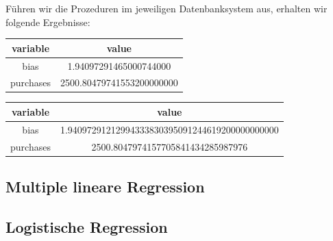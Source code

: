 Führen wir die Prozeduren im jeweiligen Datenbanksystem aus, erhalten wir folgende Ergebnisse:

\begin{center}
  \begin{tabular}{|c|c|}\hline
    \textbf{variable} & \textbf{value} \\ \hline
    bias & 1.94097291465000744000 \\ \hline
    purchases & 2500.80479741553200000000 \\ \hline
  \end{tabular}

  \begin{tabular}{|c|c|}\hline
    \textbf{variable} & \textbf{value} \\ \hline
    bias & 1.94097291212994333830395091244619200000000000 \\ \hline
    purchases & 2500.8047974157705841434285987976 \\ \hline
  \end{tabular}
\end{center}

\subsection{Multiple lineare Regression}

\subsection{Logistische Regression}
